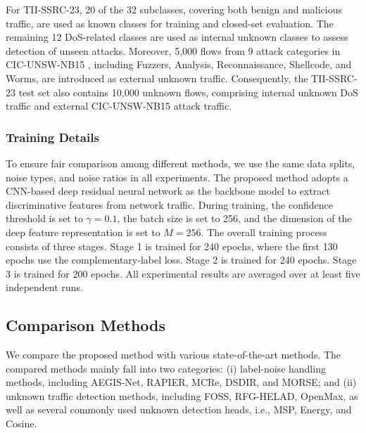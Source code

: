 \documentclass{SCIS2026}
\begin{document}
For TII-SSRC-23, 20 of the 32 subclasses, covering both benign and malicious traffic, are used as known classes for training and closed-set evaluation. The remaining 12 DoS-related classes are used as internal unknown classes to assess detection of unseen attacks. Moreover, 5,000 flows from 9 attack categories in CIC-UNSW-NB15 \cite{CIC-UNSW-NB15}, including Fuzzers, Analysis, Reconnaissance, Shellcode, and Worms, are introduced as external unknown traffic. Consequently, the TII-SSRC-23 test set also contains 10,000 unknown flows, comprising internal unknown DoS traffic and external CIC-UNSW-NB15 attack traffic.

\subsubsection{Training Details}

To ensure fair comparison among different methods, we use the same data splits, noise types, and noise ratios in all experiments. The proposed method adopts a CNN-based deep residual neural network as the backbone model to extract discriminative features from network traffic. During training, the confidence threshold is set to $\gamma=0.1$, the batch size is set to 256, and the dimension of the deep feature representation is set to $M=256$. The overall training process consists of three stages. Stage 1 is trained for 240 epochs, where the first 130 epochs use the complementary-label loss. Stage 2 is trained for 240 epochs. Stage 3 is trained for 200 epochs. All experimental results are averaged over at least five independent runs.

\subsection{Comparison Methods}
We compare the proposed method with various state-of-the-art methods. The compared methods mainly fall into two categories: (i) label-noise handling methods, including AEGIS-Net, RAPIER, MCRe, DSDIR, and MORSE; and (ii) unknown traffic detection methods, including FOSS, RFG-HELAD, OpenMax, as well as several commonly used unknown detection heads, i.e., MSP, Energy, and Cosine.

\end{document}

